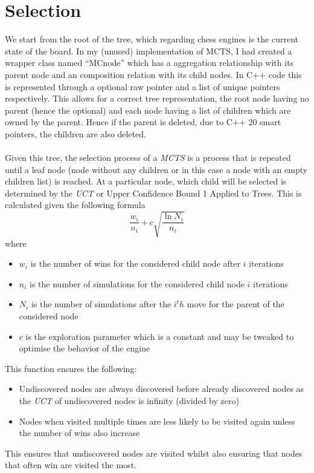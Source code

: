 \section{Selection}
We start from the root of the tree, which regarding chess engines is the current state of the board. In my (unused) implementation of MCTS, I had created a wrapper class named ``MCnode'' which has a aggregation relationship with its parent node and an composition relation with its child nodes. In C++ code this is represented through a optional raw pointer and a list of unique pointers respectively. This allows for a correct tree representation, the root node having no parent (hence the optional) and each node having a list of children which are owned by the parent. Hence if the parent is deleted, due to C++ 20 smart pointers, the children are also deleted.\\\\
Given this tree, the selection process of a \textit{MCTS} is a process that is repeated until a leaf node (node without any children or in this case a node with an empty children list) is reached. At a particular node, which child will be selected is determined by the \textit{UCT} or Upper Confidence Bound 1 Applied to Trees. This is calculated given the following formula \[\frac{w_i}{n_i} + c\sqrt{\frac{\ln{N_i}}{n_i}}\] where \begin{itemize}
    \item $w_i$ is the number of wins for the considered child node after $i$ iterations
    \item $n_i$ is the number of simulations for the considered child node $i$ iterations
    \item $N_i$ is the number of simulations after the $i^th$ move for the parent of the considered node
    \item $c$ is the exploration parameter which is a constant and may be tweaked to optimise the behavior of the engine
\end{itemize}
This function ensures the following:
\begin{itemize}
    \item Undiscovered nodes are always discovered before already discovered nodes as the \textit{UCT} of undiscovered nodes is infinity (divided by zero)
    \item Nodes when visited multiple times are less likely to be visited again unless the number of wins also increase
\end{itemize}
This ensures that undiscovered nodes are visited whilst also ensuring that nodes that often win are visited the most.
